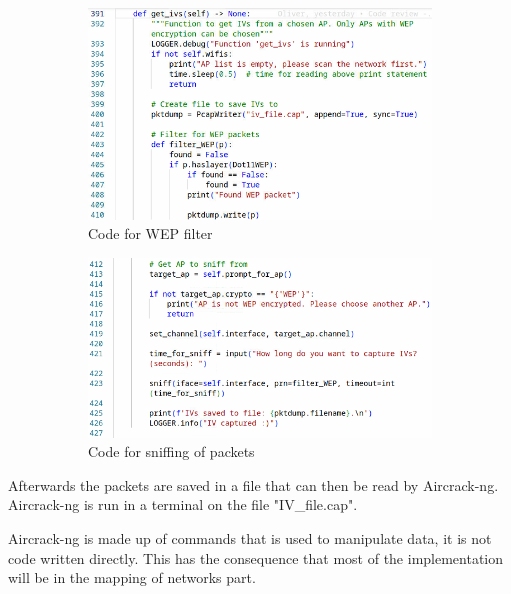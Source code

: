 \begin{figure}[!htbp]
     \centering
     \begin{subfigure}{0.49\textwidth}
         \centering
         \includegraphics[width=\textwidth]{Latex-Files/Billeder/Implementation/Code1.png}
         \caption{Code for WEP filter}
         \label{WEP_code1}
     \end{subfigure}
     \hfill
     \begin{subfigure}{0.49\textwidth}
         \centering
         \includegraphics[width=\textwidth]{Latex-Files/Billeder/Implementation/Code2.png}
         \caption{Code for sniffing of packets}
         \label{WEP_code2}
     \end{subfigure}
     \hfill
     \caption{}
\end{figure}


Afterwards the packets are saved in a file that can then be read by Aircrack-ng. Aircrack-ng is run in a terminal on the file "IV\_file.cap".

Aircrack-ng is made up of commands that is used to manipulate data, it is not code written directly. This has the consequence that most of the implementation will be in the mapping of networks part. 

